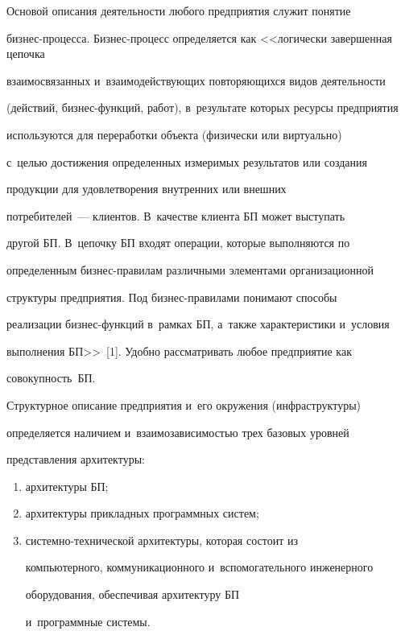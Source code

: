 {





}


  


  Основой описания деятельности любого предприятия служит понятие 


  биз\-нес-про\-цес\-са. Биз\-нес-про\-цесс определяется как <<логически завершенная цепочка 


взаимосвязанных и~вза\-и\-мо\-дей\-ст\-ву\-ющих по\-вто\-ря\-ющих\-ся видов дея\-тель\-ности 


(действий, биз\-нес-функ\-ций, работ), в~результате которых ресурсы предприятия 


используются для переработки объекта (физически или виртуально) 


с~\mbox{целью} достижения определенных измеримых результатов или создания 


продукции для удовлетворения внут\-рен\-них или внеш\-них  


по\-тре\-би\-телей~--- кли\-ен\-тов. В~качестве клиента БП может выступать 


другой БП. В~цепочку БП входят операции, которые выполняются по 


определенным биз\-нес-пра\-ви\-лам различными элементами организационной 


структуры предприятия. Под  биз\-нес-пра\-ви\-ла\-ми понимают способы 


реализации биз\-нес-функ\-ций в~рамках БП, а~также характеристики и~условия 


выполнения БП>>~[1]. Удоб\-но рас\-смат\-ри\-вать любое предприятие как  


со\-во\-куп\-ность~БП.


{





}


  


  Структурное описание предприятия и~его окружения (инфраструктуры) 


определяется наличием и~взаимозависимостью трех базовых уров\-ней  


пред\-став\-ле\-ния ар\-хи\-тек\-туры:


  \begin{enumerate}[(1)]


\item архитектуры БП;


\item архитектуры прикладных программных сис\-тем; %


\item системно-технической архитектуры, которая со\-сто\-ит из 


компьютерного, коммуникационного и~вспомогательного инженерного 


оборудования, обеспечивая архитектуру БП 


и~программные сис\-темы.


\end{enumerate}


